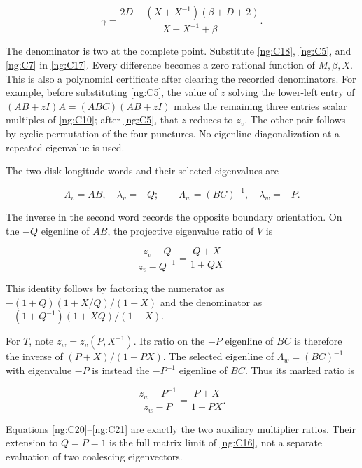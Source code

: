 \begin{equation}\label{ng:C18}
\gamma=\frac{2D-(X+X^{-1})(\beta+D+2)}
                         {X+X^{-1}+\beta}.
\end{equation}

The denominator is two at the complete point. Substitute \eqref{ng:C18}, \eqref{ng:C5}, and \eqref{ng:C7} in \eqref{ng:C17}. Every difference becomes a zero rational function of \(M,\beta,X\). This is also a polynomial certificate after clearing the recorded denominators. For example, before substituting \eqref{ng:C5}, the value of \(z\) solving the lower-left entry of
\((AB+zI)A=(ABC)(AB+zI)\) makes the remaining three entries scalar multiples of \eqref{ng:C10}; after \eqref{ng:C5}, that \(z\) reduces to \(z_v\). The other pair follows by cyclic permutation of the four punctures. No eigenline diagonalization at a repeated eigenvalue is used.

The two disk-longitude words and their selected eigenvalues are

\begin{equation}\label{ng:C19}
\Lambda_v=AB,\quad \lambda_v=-Q;
 \qquad
 \Lambda_w=(BC)^{-1},\quad \lambda_w=-P.
\end{equation}

The inverse in the second word records the opposite boundary orientation. On the \(-Q\) eigenline of \(AB\), the projective eigenvalue ratio of \(V\) is

\begin{equation}\label{ng:C20}
\frac{z_v-Q}{z_v-Q^{-1}}
                         =\frac{Q+X}{1+QX}.
\end{equation}

This identity follows by factoring the numerator as
\(-(1+Q)(1+X/Q)/(1-X)\) and the denominator as
\(-(1+Q^{-1})(1+XQ)/(1-X)\).

For \(T\), note \(z_w=z_v(P,X^{-1})\). Its ratio on the \(-P\) eigenline of \(BC\) is therefore the inverse of \((P+X)/(1+PX)\). The selected eigenline of \(\Lambda_w=(BC)^{-1}\) with eigenvalue \(-P\) is instead the \(-P^{-1}\) eigenline of \(BC\). Thus its marked ratio is

\begin{equation}\label{ng:C21}
\frac{z_w-P^{-1}}{z_w-P}
                         =\frac{P+X}{1+PX}.
\end{equation}

Equations \eqref{ng:C20}--\eqref{ng:C21} are exactly the two auxiliary multiplier ratios. Their extension to \(Q=P=1\) is the full matrix limit of \eqref{ng:C16}, not a separate evaluation of two coalescing eigenvectors.

